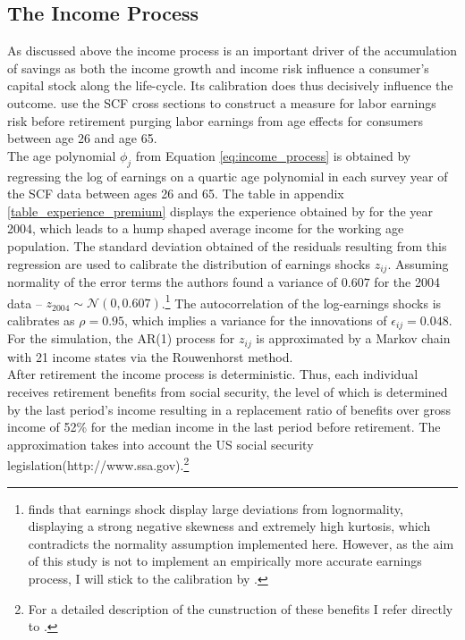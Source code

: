 \documentclass[a4paper,12pt,legno]{article}
\begin{document}
\subsection{The Income Process}
As discussed above the income process is an important driver of the accumulation of savings as both the income growth and income risk influence a consumer's capital stock along the life-cycle. Its calibration does thus decisively influence the outcome. 
\cite{hintermaier2011} use the SCF cross sections to construct a measure for labor earnings risk before retirement purging labor earnings from age effects for consumers between age 26 and age 65.\\ 
The age polynomial $\phi_{j}$ from Equation \ref{eq:income_process} is obtained by regressing the log of earnings on a quartic age polynomial in each survey year of the SCF data between ages 26 and 65. The table in appendix \ref{table_experience_premium} displays the experience obtained by \cite{hintermaier2011} for the year 2004, which leads to a hump shaped average income for the working age population.
The standard deviation obtained of the residuals resulting from this regression are used to calibrate the distribution of earnings shocks $z_{ij}$. Assuming normality of the error terms the authors found a variance of $0.607$ for the 2004 data \---  $z_{2004} \sim \mathcal{N}(0,0.607)$.\footnote{\cite{guvenen2015data} finds that earnings shock display large deviations from lognormality, displaying a strong negative skewness and extremely high kurtosis, which contradicts the normality assumption implemented here. However, as the aim of this study is not to implement an empirically more accurate earnings process, I will stick to the calibration by \cite{hintermaier2011}.} The autocorrelation of the log-earnings shocks is calibrates as $\rho = 0.95$, which implies a variance for the innovations of $\epsilon_{ij} = 0.048$. For the simulation, the AR(1) process for $z_{ij}$ is approximated by a Markov chain with 21 income states via the Rouwenhorst method. \\
After retirement the income process is deterministic. Thus, each individual receives retirement benefits from social security, the level of which is determined by the last period's income resulting in a replacement ratio of benefits over gross income of 52\% for the median income in the last period before retirement. The approximation takes into account the US social security legislation(http://www.ssa.gov).\footnote{For a detailed description of the cunstruction of these benefits I refer directly to \cite{hintermaier2011}.} \\
\end{document}
